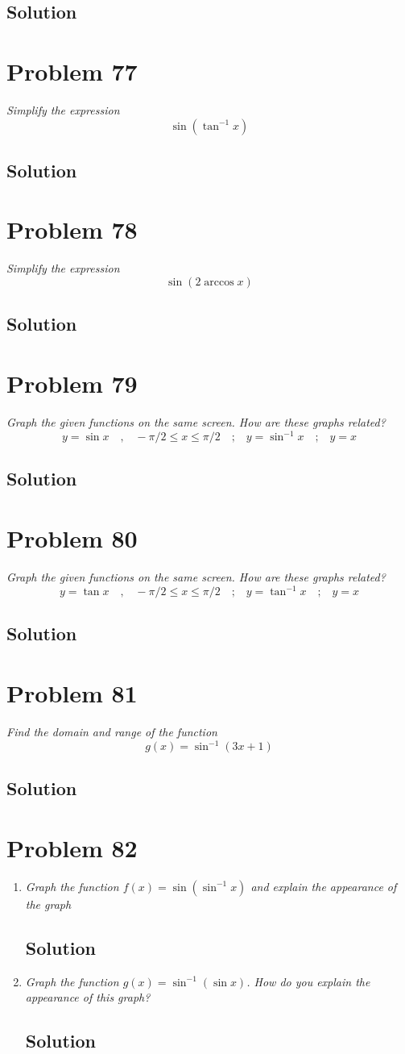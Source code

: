 \documentclass[11pt]{article}
\newcommand{\soln}{\subsection*}
\newcommand{\qn}{\textit}
\newcommand{\eqtext}[1]{\quad\text{#1}\quad}
\begin{document}
\soln{Solution}

\section*{Problem 77}

\qn{Simplify the expression $$\sin(\tan^{-1}x)$$}

\soln{Solution}

\section*{Problem 78}

\qn{Simplify the expression $$\sin(2\arccos{x})$$}

\soln{Solution}

\section*{Problem 79}

\qn{Graph the given functions on the same screen. How are these graphs related? $$y=\sin{x} \eqtext{,} -\pi/2 \le x \le \pi/2 \eqtext{;} y=\sin^{-1}x \eqtext{;} y=x$$}
\soln{Solution}

\section*{Problem 80}

\qn{Graph the given functions on the same screen. How are these graphs related? $$y=\tan{x} \eqtext{,} -\pi/2 \le x \le \pi/2 \eqtext{;} y=\tan^{-1}x \eqtext{;} y=x$$}
\soln{Solution}

\section*{Problem 81}

\qn{Find the domain and range of the function $$g(x)=\sin^{-1}(3x+1)$$}

\soln{Solution}

\section*{Problem 82}

\begin{enumerate}
	\item \qn{Graph the function $f(x)=\sin(\sin^{-1}x)$ and explain the appearance of the graph}
	\soln{Solution}
	
	\item \qn{Graph the function $g(x)=\sin^{-1}(\sin{x})$. How do you explain the appearance of this graph?}
	\soln{Solution}
\end{enumerate}
\end{document}
